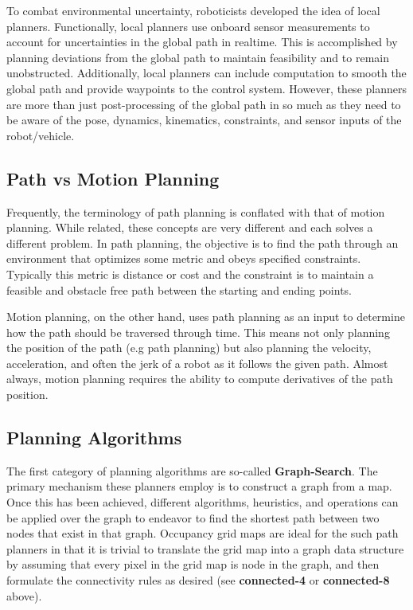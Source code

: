 To combat environmental uncertainty, roboticists developed the idea of local planners. Functionally, local planners use onboard sensor measurements to account for uncertainties in the global path in realtime. This is accomplished by planning deviations from the global path to maintain feasibility and to remain unobstructed. Additionally, local planners can include computation to smooth the global path and provide waypoints to the control system. However, these planners are more than just post-processing of the global path in so much as they need to be aware of the pose, dynamics, kinematics, constraints, and sensor inputs of the robot/vehicle.

\subsection{Path vs Motion Planning}
Frequently, the terminology of path planning is conflated with that of motion planning. While related, these concepts are very different and each solves a different problem. In path planning, the objective is to find the path through an environment that optimizes some metric and obeys specified constraints. Typically this metric is distance or cost and the constraint is to maintain a feasible and obstacle free path between the starting and ending points. 

Motion planning, on the other hand, uses path planning as an input to determine how the path should be traversed through time. This means not only planning the position of the path (e.g path planning) but also planning the velocity, acceleration, and often the jerk of a robot as it follows the given path. Almost always, motion planning requires the ability to compute derivatives of the path position. 

\subsection{Planning Algorithms}

The first category of planning algorithms are so-called \textbf{Graph-Search}. The primary mechanism these planners employ is to construct a graph from a map. Once this has been achieved, different algorithms, heuristics, and operations can be applied over the graph to endeavor to find the shortest path between two nodes that exist in that graph. Occupancy grid maps are ideal for the such path planners in that it is trivial to translate the grid map into a graph data structure by assuming that every pixel in the grid map is node in the graph, and then formulate the connectivity rules as desired (see \textbf{connected-4} or \textbf{connected-8} above). 

